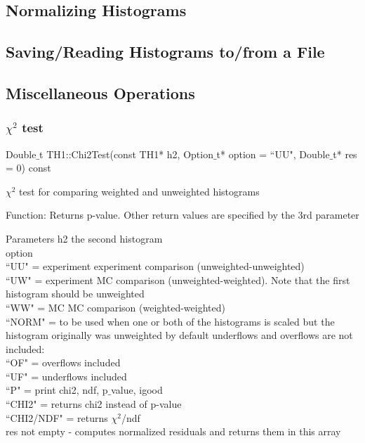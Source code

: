 \documentclass[12pt,a4paper]{article}
\begin{document}
\subsection{Normalizing Histograms}


\subsection{Saving/Reading Histograms to/from a File}

\subsection{Miscellaneous Operations}

\subsubsection{$\chi^2$ test}
Double$\_$t TH1::Chi2Test(const TH1* h2, Option$\_$t* option = ``UU", Double$\_$t* res = 0) const 

$\chi^2$ test for comparing weighted and unweighted histograms

Function: Returns p-value. Other return values are specified by the 3rd parameter

Parameters
h2	the second histogram \\
option \\
``UU" = experiment experiment comparison (unweighted-unweighted) \\
``UW" = experiment MC comparison (unweighted-weighted). Note that the first histogram should be unweighted \\
``WW" = MC MC comparison (weighted-weighted) \\
``NORM" = to be used when one or both of the histograms is scaled but the histogram originally was unweighted by default underflows and overflows are not included: \\
``OF" = overflows included \\
``UF" = underflows included \\
``P" = print chi2, ndf, p$\_$value, igood \\
``CHI2" = returns chi2 instead of p-value \\
``CHI2/NDF" = returns $\chi^2$/ndf \\
res	not empty - computes normalized residuals and returns them in this array
\end{document}
